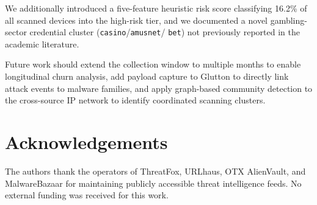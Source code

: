 \documentclass[journal]{IEEEtran}
\begin{document}
We additionally introduced a five-feature heuristic risk score classifying
16.2\% of all scanned devices into the high-risk tier, and we documented a
novel gambling-sector credential cluster (\texttt{casino}/\texttt{amusnet}/%
\texttt{bet}) not previously reported in the academic literature.

Future work should extend the collection window to multiple months to enable
longitudinal churn analysis, add payload capture to Glutton to directly link
attack events to malware families, and apply graph-based community detection
\cite{asiri2023understanding} to the cross-source IP network to identify
coordinated scanning clusters.

\section*{Acknowledgements}
The authors thank the operators of ThreatFox, URLhaus, OTX AlienVault, and
MalwareBazaar for maintaining publicly accessible threat intelligence feeds.
No external funding was received for this work.



\end{document}
